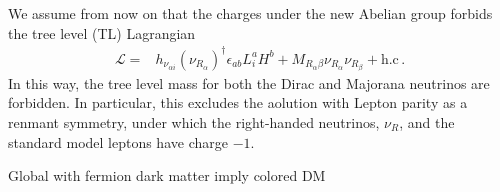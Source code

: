 We assume from now on that the charges under the new Abelian group forbids the tree level (TL) Lagrangian
\begin{align}
 \mathcal{L}= & h_{\nu_{\alpha i}}(\nu_{R_\alpha})^\dagger \epsilon_{ab}L^a_i H^b+M_{R_\alpha\beta}
  \nu_{R_\alpha} \nu_{R_\beta}+
  \text{h.c}\,.
\end{align}
In this way,  the tree level mass for both the Dirac and Majorana neutrinos are forbidden. In particular, this excludes the aolution with Lepton parity as a renmant symmetry, under which the right-handed neutrinos, $\nu_R$, and the standard model leptons have charge $-1$.



Global with fermion dark matter imply colored DM
